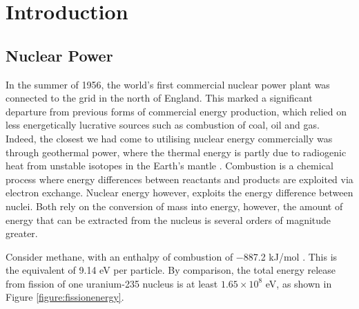 \chapter{Introduction}

\section{Nuclear Power} %

In the summer of 1956, the world's first commercial nuclear power plant was connected to the grid in the north of England. This marked a significant departure from previous forms of commercial energy production, which relied on less energetically lucrative sources such as combustion of coal, oil and gas. Indeed, the closest we had come to utilising nuclear energy commercially was through geothermal power, where the thermal energy is partly due to radiogenic heat from unstable isotopes in the Earth's mantle \cite{gando2011partial} . 
Combustion is a chemical process where energy differences between reactants and products are exploited via electron exchange. Nuclear energy however, exploits the energy difference between nuclei. Both rely on the conversion of mass into energy, however, the amount of energy that can be extracted from the nucleus is several orders of magnitude greater.

Consider methane, with an enthalpy of combustion of −887.2 kJ/mol \cite{thornton1917xv}. This is the equivalent of 9.14 eV per particle. By comparison, the total energy release from fission of one uranium-235 nucleus is at least $1.65 \times 10^{8}$ eV, as shown in Figure \ref{figure:fissionenergy}.

